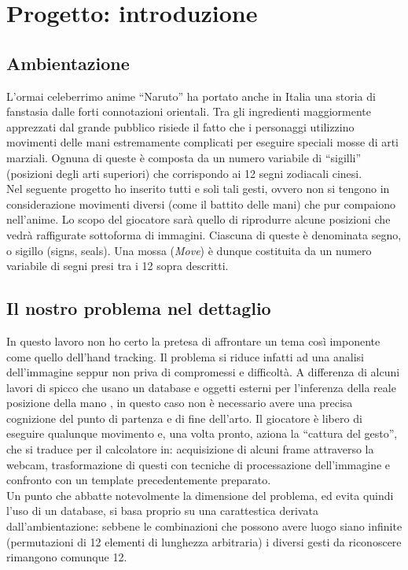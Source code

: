 \documentclass[a4paper,10pt, twocolumn]{article}
\begin{document}
\section{Progetto: introduzione}
  \subsection{Ambientazione}
  L'ormai celeberrimo anime ``Naruto'' ha portato anche in Italia una storia di fanstasia
  dalle forti connotazioni orientali. Tra gli ingredienti maggiormente apprezzati dal
  grande pubblico risiede il fatto che i personaggi utilizzino movimenti 
  delle mani estremamente complicati per eseguire speciali mosse di arti marziali.
  Ognuna di queste \`{e} composta da un numero variabile di ``sigilli'' (posizioni degli arti
  superiori) che corrispondo ai 12 segni zodiacali cinesi.\\
  Nel seguente progetto ho inserito tutti e soli tali gesti, ovvero non si tengono in considerazione
  movimenti diversi (come il battito delle mani) che pur compaiono nell'anime.
  Lo scopo del giocatore sar\`{a} quello di riprodurre
  alcune posizioni che vedr\`{a} raffigurate sottoforma di immagini. Ciascuna
  di queste \`{e} denominata segno, o sigillo (signs, seals). Una mossa (\textit{Move}) \`{e} dunque
  costituita da un numero variabile di segni presi tra i 12 sopra descritti.
  
  \subsection{Il nostro problema nel dettaglio}
  In questo lavoro non ho certo la pretesa di affrontare un tema cos\`{i} imponente come 
  quello dell'hand tracking. Il problema si riduce infatti ad una analisi dell'immagine
  seppur non priva di compromessi e difficolt\`{a}. A differenza di alcuni lavori
  di spicco che usano un database e oggetti esterni
  per l'inferenza della reale posizione della mano \cite{mitGlove}, in questo caso non
  \`{e} necessario avere una precisa cognizione del punto di partenza e di 
  fine dell'arto.
  Il giocatore \`{e} libero di eseguire qualunque movimento e, una volta pronto,
  aziona la ``cattura del gesto'', che si traduce per il calcolatore in: acquisizione 
  di alcuni frame attraverso la webcam, trasformazione di questi con tecniche di processazione
  dell'immagine e confronto con un template precedentemente preparato.\\
  Un punto che abbatte notevolmente la dimensione del problema, ed evita quindi l'uso 
  di un database, si basa proprio su una carattestica derivata dall'ambientazione:
  sebbene le combinazioni che possono avere luogo siano infinite (permutazioni di 12 
  elementi di lunghezza arbitraria) i diversi gesti da riconoscere rimangono comunque 12.
  
\end{document}
